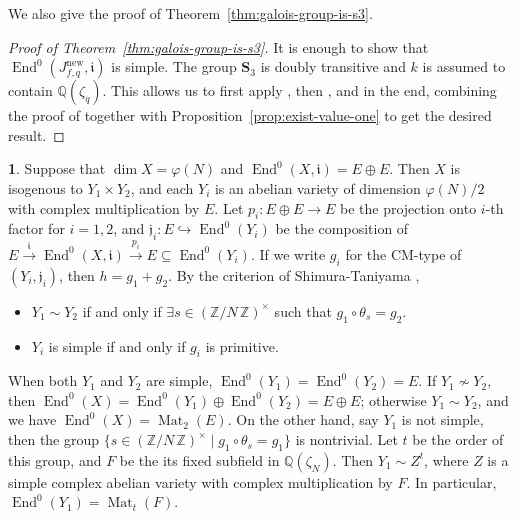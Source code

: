 \documentclass{amsart}[11pt]
\theoremstyle{definition}
\newtheorem{sect}[thm]{}
\numberwithin{equation}{section}
\theoremstyle{notitle}
\begin{document}
We also give the proof of Theorem~\ref{thm:galois-group-is-s3}. 

\begin{proof}[Proof of Theorem~\ref{thm:galois-group-is-s3}]
  It is enough to show that $\operatorname{End}^0(J_{f,q}^{\mathrm{new}}, {\mathfrak{i}})$ is simple.  The
  group $\mathbf{S}_3$ is doubly transitive and $k$ is assumed to
  contain ${\mathbb{Q}}(\zeta_q)$. This allows us to first apply \cite[Theorem
  5.13]{MR2349666}, then \cite[Lemma 3.8]{MR2471095}, and in the end,
  combining the proof of \cite[Theorem 3.12]{MR2471095} together with
  Proposition~\ref{prop:exist-value-one} to get the desired result.
\end{proof}

\begin{sect}\label{subsec:case-centralizer-is-E-plus-E}
  Suppose that $\dim X= \varphi(N)$ and $\operatorname{End}^0(X, {\mathfrak{i}})=E\oplus
  E$. Then $X$ is isogenous to $Y_1\times Y_2$, and each $Y_i$ is an
  abelian variety of dimension $\varphi(N)/2$ with complex
  multiplication by $E$.  Let $p_i: E\oplus E\to E$ be the projection
  onto $i$-th factor for $i=1,2$, and ${\mathfrak{j}}_i:
  E\hookrightarrow \operatorname{End}^0(Y_i)$ be the composition of
  $E\xrightarrow{\mathfrak{i}} \operatorname{End}^0(X, {\mathfrak{i}}) \xrightarrow{p_i} E
  \subseteq \operatorname{End}^0(Y_i)$. If we write $g_i$ for the CM-type of $(Y_i,
  {\mathfrak{j}}_i)$, then $h=g_1+g_2$. By the criterion of Shimura-Taniyama
  \cite{Shimura_CM},
  \begin{itemize}
  \item $Y_1\sim Y_2$ if and only if $\exists s\in {(\mathbb{Z}/ {N}\, \mathbb{Z})^\times}$ such that
    $g_1\circ \theta_s= g_2$. 
  \item $Y_i$ is simple if and only if $g_i$ is primitive. 
  \end{itemize}
  When both $Y_1$ and $Y_2$ are simple, $\operatorname{End}^0(Y_1)=\operatorname{End}^0(Y_2)=E$.
  If $Y_1\not\sim Y_2$, then
  $\operatorname{End}^0(X)= \operatorname{End}^0(Y_1)\oplus \operatorname{End}^0(Y_2)=E\oplus E$; otherwise
  $Y_1\sim Y_2$, and we have $\operatorname{End}^0(X)= \operatorname{Mat}_2(E)$. On the other
  hand, say $Y_1$ is not simple, then the group $\{s\in {(\mathbb{Z}/ {N}\, \mathbb{Z})^\times}\mid
  g_1\circ \theta_s= g_1\}$ is nontrivial. Let $t$ be the order of
  this group, and $F$ be the its fixed subfield in
  ${\mathbb{Q}}(\zeta_N)$. Then $Y_1\sim Z^t$, where $Z$ is a simple complex
  abelian variety with complex multiplication by $F$. In particular,
  $\operatorname{End}^0(Y_1)=\operatorname{Mat}_t(F)$.
\end{sect}
\end{document}
